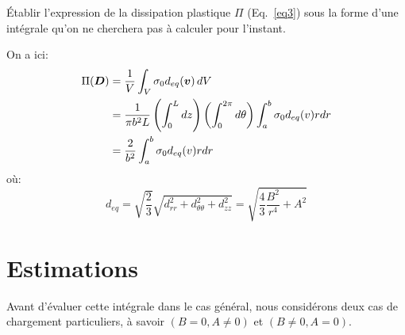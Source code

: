\documentclass[french,12pt]{exam}
\begin{document}
\begin{questions}
\question \'Etablir l'expression de la dissipation plastique $\Pi$ (Eq.~\ref{eq3}) sous la forme d'une intégrale qu'on ne cherchera pas à calculer pour l'instant.
\begin{solution}
On a ici:
\begin{align*}\Pi(\boldsymbol{D}) &= \frac{1}{V} \int_V \sigma_0 d_{eq}(\boldsymbol{v}) \,dV \\
&= \frac{1}{\pi b^2 L} \left(\int_0^L dz\right)\left(\int_0^{2\pi} d\theta\right)\int_a^b \sigma_0 d_{eq}(v) rdr\\
&= \frac{2}{b^2} \int_a^b \sigma_0 d_{eq}(v) rdr
\end{align*}
où:
$$d_{eq} = \sqrt{\dfrac{2}{3}}\sqrt{d_{rr}^2+d_{\theta\theta}^2+d_{zz}^2} = \sqrt{\dfrac{4}{3}\dfrac{B^2}{r^4}+A^2}$$
\end{solution}
\end{questions}

\section{Estimations}
Avant d'évaluer cette intégrale dans le cas général, nous considérons deux cas de chargement particuliers, à savoir $(B = 0, A \neq 0)$ et  $(B \neq 0, A = 0)$.\\
\end{document}

